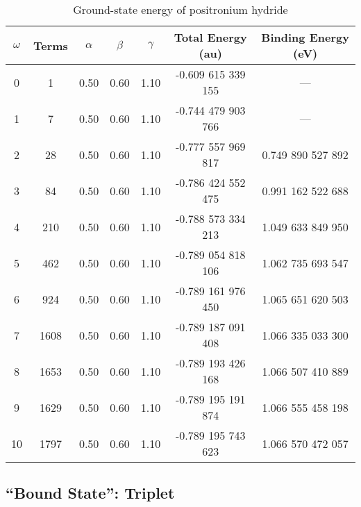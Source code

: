 \documentclass[Dissertation.tex]{subfiles}
\begin{document}
\setlength{\abovecaptionskip}{6pt}   %
\setlength{\belowcaptionskip}{6pt}   %
\begin{table}[H]
\centering
\begin{tabular}{c c c c c c c}
\toprule
$\omega$ & Terms & $\alpha$ & $\beta$ & $\gamma$ & Total Energy (au) & Binding Energy (eV) \\ [0.5ex]
\midrule
0 & 1 & 0.50 & 0.60 & 1.10 & -0.609 615 339 155 & --- \\
1 & 7 & 0.50 & 0.60 & 1.10 & -0.744 479 903 766 & --- \\
2 & 28 & 0.50 & 0.60 & 1.10 &    -0.777 557 969 817 & 0.749 890 527 892 \\
3 & 84 & 0.50 & 0.60 & 1.10 &    -0.786 424 552 475 & 0.991 162 522 688 \\
4 & 210 & 0.50 & 0.60 & 1.10 &   -0.788 573 334 213 & 1.049 633 849 950 \\
5 & 462 & 0.50 & 0.60 & 1.10 &   -0.789 054 818 106 & 1.062 735 693 547 \\
6 & 924 & 0.50 & 0.60 & 1.10 &   -0.789 161 976 450 & 1.065 651 620 503 \\
7 & 1608 & 0.50 & 0.60 & 1.10 &  -0.789 187 091 408 & 1.066 335 033 300 \\
8 & 1653 & 0.50 & 0.60 & 1.10 &  -0.789 193 426 168 & 1.066 507 410 889 \\
9 & 1629 & 0.50 & 0.60 & 1.10 &  -0.789 195 191 874 & 1.066 555 458 198 \\
10 & 1797 & 0.50 & 0.60 & 1.10 & -0.789 195 743 623 & 1.066 570 472 057 \\
\bottomrule
\end{tabular}
\caption{Ground-state energy of positronium hydride} %
\label{tab:BoundEnergy}
\end{table}




\subsection{``Bound State'': Triplet}
\end{document}
